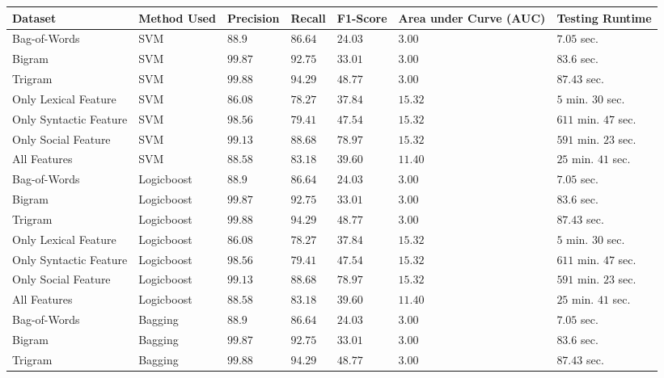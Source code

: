 \begin{table*}[htb]
  \centering
  {\small
  \begin{tabular}{|@{~}l@{~~}|@{~~}l@{~}|@{~~}l@{~}|@{~~}l@{~}|@{~~}l@{~}|@{~~}l@{~}|@{~~}l@{~}|}
\hline
Dataset & Method Used & Precision & Recall & F1-Score & Area under Curve (AUC) & Testing Runtime \\\hline
Bag-of-Words & SVM & $88.9$ & $86.64$ & $24.03$ & $3.00$ & $7.05$ sec. \\\hline
Bigram & SVM & $99.87$ & $92.75$ & $33.01$ & $3.00$ & $83.6$ sec. \\\hline
Trigram & SVM & $99.88$ & $94.29$ & $48.77$ & $3.00$ & $87.43$ sec. \\\hline
Only Lexical Feature & SVM & $86.08$ & $78.27$ & $37.84$ & $15.32$ & $5$ min. $30$ sec. \\\hline
Only Syntactic Feature & SVM & $98.56$ & $79.41$ & $47.54$ & $15.32$ & $611$ min. $47$ sec.\\\hline
Only Social Feature & SVM & $99.13$ & $88.68$ & $78.97$ & $15.32$ & $591$ min. $23$ sec. \\\hline
All Features & SVM & $88.58$ & $83.18$ & $39.60$ & $11.40$ & $25$ min. $41$ sec. \\\hline
Bag-of-Words & Logicboost & $88.9$ & $86.64$ & $24.03$ & $3.00$ & $7.05$ sec. \\\hline
Bigram & Logicboost & $99.87$ & $92.75$ & $33.01$ & $3.00$ & $83.6$ sec. \\\hline
Trigram & Logicboost & $99.88$ & $94.29$ & $48.77$ & $3.00$ & $87.43$ sec. \\\hline
Only Lexical Feature & Logicboost & $86.08$ & $78.27$ & $37.84$ & $15.32$ & $5$ min. $30$ sec. \\\hline
Only Syntactic Feature & Logicboost & $98.56$ & $79.41$ & $47.54$ & $15.32$ & $611$ min. $47$ sec.\\\hline
Only Social Feature & Logicboost & $99.13$ & $88.68$ & $78.97$ & $15.32$ & $591$ min. $23$ sec. \\\hline
All Features & Logicboost & $88.58$ & $83.18$ & $39.60$ & $11.40$ & $25$ min. $41$ sec. \\\hline
Bag-of-Words & Bagging & $88.9$ & $86.64$ & $24.03$ & $3.00$ & $7.05$ sec. \\\hline
Bigram & Bagging & $99.87$ & $92.75$ & $33.01$ & $3.00$ & $83.6$ sec. \\\hline
Trigram & Bagging & $99.88$ & $94.29$ & $48.77$ & $3.00$ & $87.43$ sec. \\\hline

\end{tabular}}
\end{table*}
